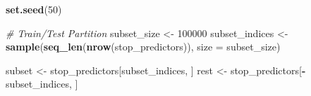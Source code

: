 \documentclass[
  12pt,
]{article}
\newenvironment{Shaded}{\begin{snugshade}}{\end{snugshade}}
\newcommand{\AttributeTok}[1]{\textcolor[rgb]{0.13,0.29,0.53}{#1}}
\newcommand{\CommentTok}[1]{\textcolor[rgb]{0.56,0.35,0.01}{\textit{#1}}}
\newcommand{\DecValTok}[1]{\textcolor[rgb]{0.00,0.00,0.81}{#1}}
\newcommand{\FunctionTok}[1]{\textcolor[rgb]{0.13,0.29,0.53}{\textbf{#1}}}
\newcommand{\NormalTok}[1]{#1}
\newcommand{\OtherTok}[1]{\textcolor[rgb]{0.56,0.35,0.01}{#1}}
\newcommand{\SpecialCharTok}[1]{\textcolor[rgb]{0.81,0.36,0.00}{\textbf{#1}}}
\begin{document}
\begin{Shaded}
\begin{Highlighting}[]
\FunctionTok{set.seed}\NormalTok{(}\DecValTok{50}\NormalTok{)}

\CommentTok{\# Train/Test Partition}
\NormalTok{subset\_size }\OtherTok{\textless{}{-}} \DecValTok{100000}
\NormalTok{subset\_indices }\OtherTok{\textless{}{-}} \FunctionTok{sample}\NormalTok{(}\FunctionTok{seq\_len}\NormalTok{(}\FunctionTok{nrow}\NormalTok{(stop\_predictors)), }\AttributeTok{size =}\NormalTok{ subset\_size)}

\NormalTok{subset }\OtherTok{\textless{}{-}}\NormalTok{ stop\_predictors[subset\_indices, ]}
\NormalTok{rest }\OtherTok{\textless{}{-}}\NormalTok{ stop\_predictors[}\SpecialCharTok{{-}}\NormalTok{subset\_indices, ]}
\end{Highlighting}
\end{Shaded}
\end{document}
